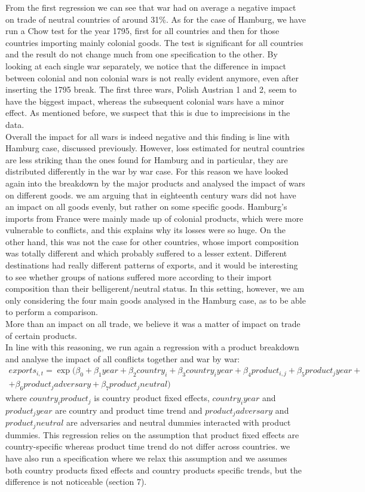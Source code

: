 \documentclass[12pt,a4paper,titlepage,english]{article}
\begin{document}
From the first regression we can see that war had on average a negative impact on trade of neutral countries of around 31\%. As for the case of Hamburg, we have run a Chow test for the year 1795, first for all countries and then for those countries importing mainly colonial goods. The test is significant for all countries and the result do not change much from one specification to the other. 
By looking at each single war separately, we notice that the difference in impact between colonial and non colonial wars is not really evident anymore, even after inserting the 1795 break. The first three wars, Polish Austrian 1 and 2, seem to have the biggest impact, whereas the subsequent colonial wars have a minor effect. As mentioned before, we suspect that this is due to imprecisions in the data. \\
Overall the impact for all wars is indeed negative and this finding is line with Hamburg case, discussed previously. However, loss estimated for neutral countries are less striking than the ones found for Hamburg and in particular, they are distributed differently  in the war by war case.
For this reason we have looked again into the breakdown by the major products and analysed the impact of wars on different goods. we am arguing that in eighteenth century wars did not have an impact on all goods evenly, but rather on some specific goods. Hamburg's imports from France were mainly made up of colonial products, which were more vulnerable to conflicts, and this explains why its losses were so huge. On the other hand, this was not the case for other countries, whose import composition was totally different and which probably suffered to a lesser extent. Different destinations had really different patterns of exports, and it would be interesting to see whether groups of nations suffered more according to their import composition than their belligerent/neutral status. 
In this setting, however, we am only considering the four main goods analysed in the Hamburg case, as to be able to perform a comparison.\\
More than an impact on all trade, we believe it was a matter of impact on trade of certain products. \\
In line with this reasoning, we run again a regression with a product breakdown and analyse the impact of all conflicts together and war by war:
\begin{multline}
exports_{i,t}=\exp(\beta_0+\beta_1year +\beta_2country_i+\beta_3country_iyear+\beta_4product_{i,j}+\beta_5product_jyear+\\+\beta_6product_jadversary + \beta_7product_jneutral)
\end{multline}
where $country_iproduct_j$ is country product fixed effects, $country_iyear$ and $product_jyear$ are country and product time trend and $product_jadversary$ and $product_jneutral$ are adversaries and neutral dummies interacted with product dummies. This regression relies on the assumption that product fixed effects are country-specific whereas product time trend do not differ across countries. we have also run a specification where we relax this assumption and we assumes both country products fixed effects and country products specific trends, but the difference is not noticeable (section 7). 
\end{document}
